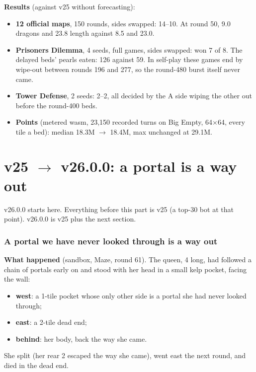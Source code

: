 \documentclass[11pt,a4paper]{article}
\begin{document}
\textbf{Results} (against v25 without forecasting):
\begin{itemize}
  \item \textbf{12 official maps}, 150 rounds, sides swapped: 14--10. At round 50, 9.0 dragons and 23.8 length against 8.5 and
        23.0.
  \item \textbf{Prisoners Dilemma}, 4 seeds, full games, sides swapped: won 7 of 8. The delayed beds' pearls eaten: 126 against
        59. In self-play these games end by wipe-out between rounds 196 and 277, so the round-480 burst itself never came.
  \item \textbf{Tower Defense}, 2 seeds: 2--2, all decided by the A side wiping the other out before the round-400 beds.
  \item \textbf{Points} (metered wasm, 23,150 recorded turns on Big Empty, 64$\times$64, every tile a bed): median 18.3M
        $\rightarrow$ 18.4M, max unchanged at 29.1M.
\end{itemize}


\part{v25 $\rightarrow$ v26.0.0: a portal is a way out}
v26.0.0 starts here. Everything before this part is v25 (a top-30 bot at that point). v26.0.0 is v25 plus the next section.

\section{A portal we have never looked through is a way out}\label{sec:door}
\textbf{What happened} (sandbox, Maze, round 61). The queen, 4 long, had followed a chain of portals early on and stood with her
head in a small kelp pocket, facing the wall:
\begin{itemize}
  \item \textbf{west}: a 1-tile pocket whose only other side is a portal she had never looked through;
  \item \textbf{east}: a 2-tile dead end;
  \item \textbf{behind}: her body, back the way she came.
\end{itemize}
She split (her rear 2 escaped the way she came), went east the next round, and died in the dead end.
\end{document}
